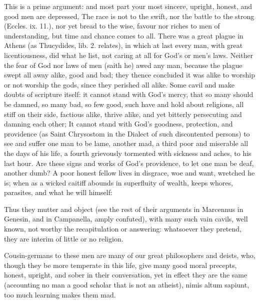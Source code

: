 {This is a prime argument: and most part your most sincere, upright,
honest, and good men are depressed, The race is not to the swift,
nor the battle to the strong (Eccles. ix. 11.), nor yet bread to the
wise, favour nor riches to men of understanding, but time and chance
comes to all. There was a great plague in Athens (as Thucydides, lib.
2. relates), in which at last every man, with great licentiousness, did
what he list, not caring at all for God's or men's laws. Neither the
fear of God nor laws of men (saith he) awed any man, because the plague
swept all away alike, good and bad; they thence concluded it was alike
to worship or not worship the gods, since they perished all alike. Some
cavil and make doubts of scripture itself: it cannot stand with God's
mercy, that so many should be damned, so many bad, so few good, such
have and hold about religions, all stiff on their side, factious alike,
thrive alike, and yet bitterly persecuting and damning each other; It
cannot stand with God's goodness, protection, and providence (as
Saint Chrysostom in the Dialect of such discontented persons) to
see and suffer one man to be lame, another mad, a third poor and
miserable all the days of his life, a fourth grievously tormented with
sickness and aches, to his last hour. Are these signs and works of
God's providence, to let one man be deaf, another dumb? A poor honest
fellow lives in disgrace, woe and want, wretched he is; when as a
wicked caitiff abounds in superfluity of wealth, keeps whores,
parasites, and what he will himself:


Thus they mutter and object (see the rest of their
arguments in Marcennus in Genesin, and in Campanella, amply confuted),
with many such vain cavils, well known, not worthy the recapitulation
or answering: whatsoever they pretend, they are interim of little or no
religion.

Cousin-germans to these men are many of our great philosophers and
deists, who, though they be more temperate in this life, give many good
moral precepts, honest, upright, and sober in their conversation, yet
in effect they are the same (accounting no man a good scholar that is
not an atheist), nimis altum sapiunt, too much learning makes them mad.

}
